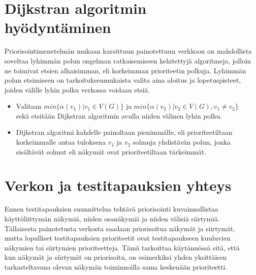 \section{Dijkstran algoritmin hyödyntäminen} \label{ch:10_dijkstran_algoritmin_hyodyntaminen}

  Priorisointimenetelmän mukaan karsittuun painotettuun verkkoon on mahdollista soveltaa lyhimmän polun ongelman ratkaisemiseen kehitettyjä algoritmeja, jolloin ne toimivat etsien alhaisimman, eli korkeimman prioriteetin polkuja.
  Lyhimmän polun etsimiseen on tarkoituksenmukaista valita aina aloitus ja lopetuspisteet, joiden välille lyhin polku verkossa voidaan etsiä.

  \begin{itemize}
    \item Valitaan \(min\{\alpha(v_1) | v_1 \in V(G)\}\) ja \(min\{\alpha(v_2) | v_2 \in V(G), v_1 \neq v_2\}\) sekä etsitään Dijkstran algoritmin avulla niiden välinen lyhin polku.
    \item Dijkstran algoritmi kahdelle painoltaan pienimmälle, eli prioriteetiltaan korkeimmalle antaa tuloksena \(v_1\) ja \(v_2\) solmuja yhdistävän polun, jonka sisältävät solmut eli näkymät ovat prioriteetiltaan tärkeimmät.
  \end{itemize}

\section{Verkon ja testitapauksien yhteys} \label{ch:10_verkon_ja_testitapauksien_yhteys}

  Ennen testitapauksien suunnittelua tehtävä priorisointi kuvainnollistaa käyttöliittymän näkymiä, niiden osanäkymiä ja niiden välisiä siirtymiä.
  Tällaisesta painotetusta verkosta saadaan priorisoitua näkymät ja siirtymät, mutta lopulliset testitapauksien prioriteetit ovat testitapaukseen kuuluvien näkymien tai siirtymien prioriteetteja.
  Tämä tarkoittaa käytännössä sitä, että kun näkymät ja siirtymät on priorisoitu, on esimerkiksi yhden yksittäisen tarkasteltavana olevan näkymän toiminnoilla sama keskenään prioriteetti.
